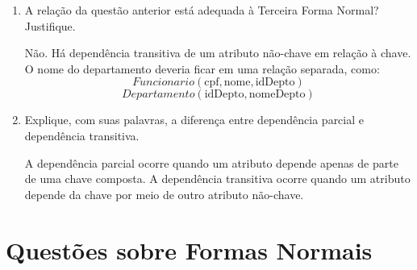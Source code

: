 \documentclass[12pt,a4paper]{article}
\begin{document}
\begin{enumerate}[resume,label=\textbf{Q\arabic*.}]
\begin{resposta}
Sim. Como:
\[
\text{cpf} \rightarrow \text{idDepto}
\]
e
\[
\text{idDepto} \rightarrow \text{nomeDepto}
\]
então:
\[
\text{cpf} \rightarrow \text{nomeDepto}
\]

Nesse caso, \texttt{nomeDepto} depende de \texttt{cpf} de forma transitiva, passando por \texttt{idDepto}.
\end{resposta}

\item A relação da questão anterior está adequada à Terceira Forma Normal? Justifique.

\begin{resposta}
Não. Há dependência transitiva de um atributo não-chave em relação à chave. O nome do departamento deveria ficar em uma relação separada, como:
\[
Funcionario(\text{cpf}, \text{nome}, \text{idDepto})
\]
\[
Departamento(\text{idDepto}, \text{nomeDepto})
\]
\end{resposta}

\item Explique, com suas palavras, a diferença entre dependência parcial e dependência transitiva.

\begin{resposta}
A dependência parcial ocorre quando um atributo depende apenas de parte de uma chave composta. A dependência transitiva ocorre quando um atributo depende da chave por meio de outro atributo não-chave.
\end{resposta}

\end{enumerate}

\section{Questões sobre Formas Normais}
\end{document}

